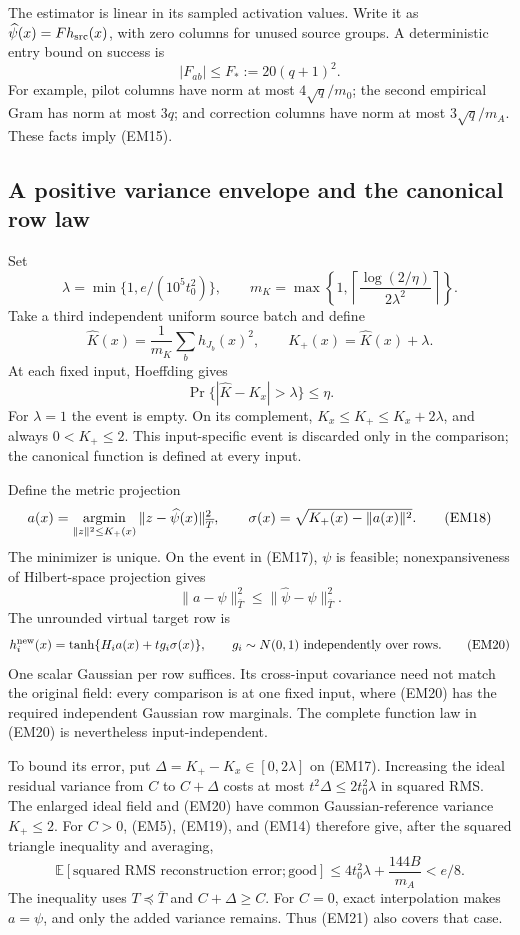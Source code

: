 The estimator is linear in its sampled activation values. Write it as
$\widehat\psi(x)=Fh_{\rm src}(x)$, with zero columns for unused source
groups. A deterministic entry bound on success is
\[
 |F_{ab}|\le F_*:=20(q+1)^2.
 \tag{EM15}
\]
For example, pilot columns have norm at most $4\sqrt q/m_0$;
the second empirical Gram has norm at most $3q$; and correction columns
have norm at most $3\sqrt q/m_A$. These facts imply (EM15).

\subsection{A positive variance envelope and the canonical row law}

Set
\[
 \lambda=\min\{1,e/(10^5t_0^2)\},\qquad
 m_K=\max\left\{1,\left\lceil
                \frac{\log(2/\eta)}{2\lambda^2}\right\rceil\right\}.
 \tag{EM16}
\]
Take a third independent uniform source batch and define
\[
 \widehat K(x)=\frac1{m_K}\sum_b h_{J_b}(x)^2,
 \qquad K_+(x)=\widehat K(x)+\lambda.
\]
At each fixed input, Hoeffding gives
\[
 \Pr\{|\widehat K-K_x|>\lambda\}\le\eta.
 \tag{EM17}
\]
For $\lambda=1$ the event is empty. On its complement,
$K_x\le K_+\le K_x+2\lambda$, and always $0<K_+\le2$.
This input-specific event is discarded only in the comparison; the
canonical function is defined at every input.

Define the metric projection
\[
 a(x)=\mathop{\rm argmin}_{\|z\|^2\le K_+(x)}
                   \|z-\widehat\psi(x)\|_{\overline T}^2,
 \qquad \sigma(x)=\sqrt{K_+(x)-\|a(x)\|^2}.
 \tag{EM18}
\]
The minimizer is unique. On the event in (EM17), $\psi$ is feasible;
nonexpansiveness of Hilbert-space projection gives
\[
 \|a-\psi\|_{\overline T}^2
       \le\|\widehat\psi-\psi\|_{\overline T}^2.
 \tag{EM19}
\]
The unrounded virtual target row is
\[
 h_i^{\rm new}(x)=\tanh\{H_i a(x)+t g_i\sigma(x)\},
 \qquad g_i\sim N(0,1)\text{ independently over rows}.
 \tag{EM20}
\]
One scalar Gaussian per row suffices. Its cross-input covariance need
not match the original field: every comparison is at one fixed input,
where (EM20) has the required independent Gaussian row marginals.
The complete function law in (EM20) is nevertheless input-independent.

To bound its error, put $\Delta=K_+-K_x\in[0,2\lambda]$ on (EM17).
Increasing the ideal residual variance from $C$ to $C+\Delta$ costs
at most $t^2\Delta\le2t_0^2\lambda$ in squared RMS. The enlarged ideal
field and (EM20) have common Gaussian-reference variance $K_+\le2$.
For $C>0$, (EM5), (EM19), and (EM14) therefore give, after the squared
triangle inequality and averaging,
\[
 \mathbb E[\text{squared RMS reconstruction error};\text{good}]
 \le4t_0^2\lambda+\frac{144B}{m_A}<e/8.
 \tag{EM21}
\]
The inequality uses $T\preceq\overline T$ and $C+\Delta\ge C$.
For $C=0$, exact interpolation makes $a=\psi$, and only the added
variance remains. Thus (EM21) also covers that case.


